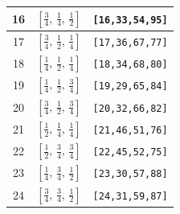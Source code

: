 \documentclass[fleqn,8pt]{jsarticle}
\begin{document}
\begin{longtable}{ccc}
16 & $\left[ \frac{3}{4},\, \frac{1}{4},\, \frac{1}{2} \right]$ & {\tt [16,33,54,95]} \\ \hline
17 & $\left[ \frac{3}{4},\, \frac{1}{2},\, \frac{1}{4} \right]$ & {\tt [17,36,67,77]} \\ \hline
18 & $\left[ \frac{1}{4},\, \frac{1}{2},\, \frac{1}{4} \right]$ & {\tt [18,34,68,80]} \\ \hline
19 & $\left[ \frac{1}{4},\, \frac{1}{2},\, \frac{3}{4} \right]$ & {\tt [19,29,65,84]} \\ \hline
20 & $\left[ \frac{3}{4},\, \frac{1}{2},\, \frac{3}{4} \right]$ & {\tt [20,32,66,82]} \\ \hline
21 & $\left[ \frac{1}{2},\, \frac{1}{4},\, \frac{1}{4} \right]$ & {\tt [21,46,51,76]} \\ \hline
22 & $\left[ \frac{1}{2},\, \frac{3}{4},\, \frac{3}{4} \right]$ & {\tt [22,45,52,75]} \\ \hline
23 & $\left[ \frac{1}{4},\, \frac{3}{4},\, \frac{1}{2} \right]$ & {\tt [23,30,57,88]} \\ \hline
24 & $\left[ \frac{3}{4},\, \frac{3}{4},\, \frac{1}{2} \right]$ & {\tt [24,31,59,87]} \\
\end{longtable}
\renewcommand{\arraystretch}{1.2}
\end{document}
